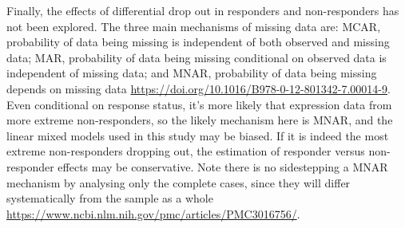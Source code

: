 \begin{outline}
Finally, the effects of differential drop out in responders and non-responders has not been explored.
The three main mechanisms of missing data are:
\gls{MCAR}, probability of data being missing is independent of both observed and missing data;
\gls{MAR}, probability of data being missing conditional on observed data is independent of missing data;
and \gls{MNAR}, probability of data being missing depends on missing data \url{https://doi.org/10.1016/B978-0-12-801342-7.00014-9}.
Even conditional on response status, it's more likely that expression data from more extreme non-responders, so the likely mechanism here is \gls{MNAR},
and the linear mixed models used in this study may be biased.
If it is indeed the most extreme non-responders dropping out, the estimation of responder versus non-responder effects may be conservative.
Note there is no sidestepping a \gls{MNAR} mechanism by analysing only the complete cases, 
since they will differ systematically from the sample as a whole \url{https://www.ncbi.nlm.nih.gov/pmc/articles/PMC3016756/}.


\end{outline}
